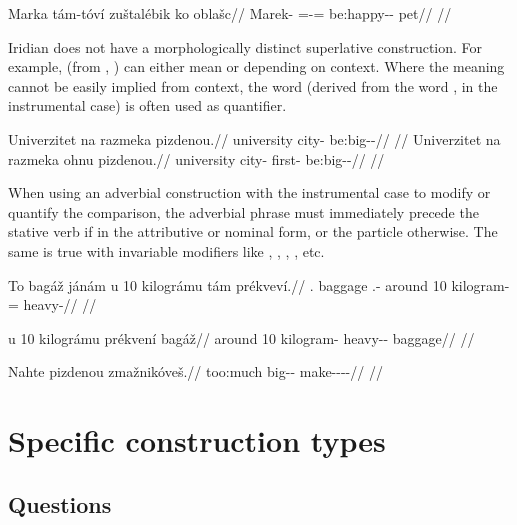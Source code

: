 \ex
\begingl
\gla Marka tám-tóví zuštalébik ko oblašc//
\glb Marek-\Pat{} \Comp{}=\Rz{}-\Gen{}= be:happy-\Ben{}-\Pf{} \Lnk{} pet//
\glft {}//
\endgl
\xe

Iridian does not have a morphologically distinct superlative construction. For example,  (from , ) can either mean  or  depending on context. Where the meaning cannot be easily implied from context, the word  (derived from the word ,  in the instrumental case) is often used as quantifier.

\pex
\a
\begingl
\gla Univerzitet na razmeka pizdenou.//
\glb university \Loc{} city-\Pat{} be:big-\Comp{}-\Nz{}//
\glft {}//
\endgl
\a
\begingl
\gla Univerzitet na razmeka ohnu pizdenou.//
\glb university \Loc{} city-\Pat{} first-\Ins{} be:big-\Comp{}-\Nz{}//
\glft {}//
\endgl
\xe

When using an adverbial construction with the instrumental case to modify or quantify the comparison, the adverbial phrase must immediately precede the stative verb if in the attributive or nominal form, or the particle  otherwise. The same is true with invariable modifiers like , , , , etc.

\ex
\begingl
\gla To bagáž jánám u 10 kilográmu tám prékvev\'i.//
\glb \Dem{}.\Prox{} baggage \Dem{}.\Med{}-\Agt{} around 10 kilogram-\Ins{} \Comp{}= heavy-\Cont{}//
\glft {}//
\endgl
\xe

\ex
\begingl
\gla u 10 kilográmu prékvení bagáž//
\glb around 10 kilogram-\Ins{} heavy-\Comp{}-\Att{} baggage//
\glft {}//
\endgl
\xe

\ex
\begingl
\gla Nahte pizdenou zmažnikóveš.//
\glb too:much big-\Comp{}-\Nz{} make-\Pv{}-\Pf{}-\Nz{}-\Second{}\Sg{}//
\glft {}//
\endgl
\xe

\section{Specific construction types}
\subsection{Questions}

